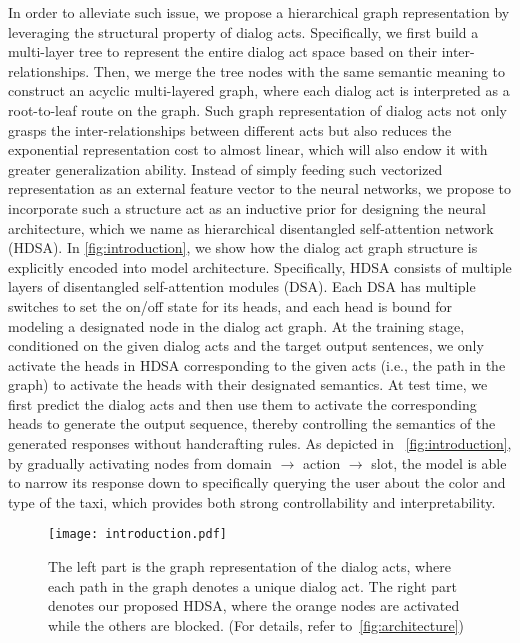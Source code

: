 \documentclass[11pt,a4paper]{article}
\begin{document}
In order to alleviate such issue, we propose a hierarchical graph representation by leveraging the structural property of dialog acts. Specifically, we first build a multi-layer tree to represent the entire dialog act space based on their inter-relationships. Then, we merge the tree nodes with the same semantic meaning to construct an acyclic multi-layered graph, where each dialog act is interpreted as a root-to-leaf route on the graph. Such graph representation of dialog acts not only grasps the inter-relationships between different acts but also reduces the exponential representation cost to almost linear, which will also endow it with greater generalization ability. Instead of simply feeding such vectorized representation as an external feature vector to the neural networks, we propose to incorporate such a structure act as an inductive prior for designing the neural architecture, which we name as hierarchical disentangled self-attention network (HDSA).
In \autoref{fig:introduction}, we show how the dialog act graph structure is explicitly encoded into model architecture. Specifically, HDSA consists of multiple layers of disentangled self-attention modules (DSA). Each DSA has multiple switches to set the on/off state for its heads, and each head is bound for modeling a designated node in the dialog act graph. At the training stage, conditioned on the given dialog acts and the target output sentences, we only activate the heads in HDSA corresponding to the given acts (i.e., the path in the graph) to activate the heads with their designated semantics. At test time, we first predict the dialog acts and then use them to activate the corresponding heads to generate the output sequence, thereby controlling the semantics of the generated responses without handcrafting rules. As depicted in ~\autoref{fig:introduction}, by gradually activating nodes from domain $\rightarrow$ action $\rightarrow$ slot, the model is able to narrow its response down to specifically querying the user about the color and type of the taxi, which provides both strong controllability and interpretability.
\begin{figure}[t]
\begin{center}
    \texttt{[image: introduction.pdf]}
    \end{center}
    \caption{The left part is the graph representation of the dialog acts, where each path in the graph denotes a unique dialog act. The right part denotes our proposed HDSA, where the orange nodes are activated while the others are blocked. (For details, refer to~\autoref{fig:architecture})}
    \label{fig:introduction}
\end{figure}
\end{document}
